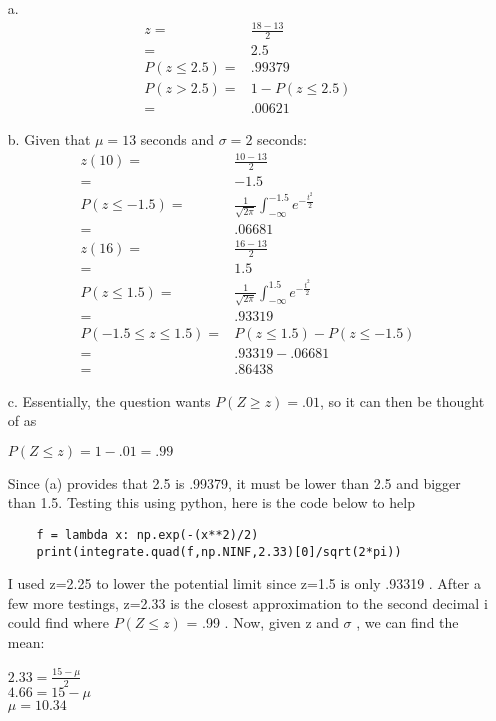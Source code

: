 \documentclass{article}
\begin{document}
\begin{enumerate}
	\item[a.] 
	\begin{align*}
		z =& \frac{18-13}{2} \\
		 =& 2.5 \\
		P(z\leq 2.5) =& .99379\\
		P(z>2.5) =& 1 - P(z\leq 2.5) \\
		 =&  .00621
	\end{align*}
	
	\item[b.] Given that $\mu = 13$ seconds and $\sigma = 2$ seconds:
	\begin{align*}
		z(10) =& \frac{10-13}{2} \\
			=& -1.5 \\
		P(z\leq -1.5) =& \frac{1}{\sqrt{2\pi}}\int_{-\infty}^{-1.5} e^{-\displaystyle \frac{t^2}{2}}\\
			=& .06681 \\
		z(16) =& \frac{16-13}{2} \\
			=& 1.5 \\
		P(z\leq 1.5) =& \frac{1}{\sqrt{2\pi}}\int_{-\infty}^{1.5} e^{-\displaystyle \frac{t^2}{2}}\\
			=& .93319\\
		P(-1.5\leq z\leq 1.5) =& P(z\leq 1.5) - P(z\leq -1.5)\\
			=& .93319 - .06681\\
			=& .86438
	\end{align*}
	
	\item[c.] Essentially, the question wants $P(Z\geq z) = .01$, so it can then be thought of as 
	\begin{center}
		$P(Z\leq z) = 1 - .01 = .99$
	\end{center}
	Since (a) provides that 2.5 is .99379, it must be lower than 2.5 and bigger than 1.5. Testing this using python, here is the code below to help
	\begin{verbatim}
	f = lambda x: np.exp(-(x**2)/2)
	print(integrate.quad(f,np.NINF,2.33)[0]/sqrt(2*pi))
	\end{verbatim}
	I used z=2.25 to lower the potential limit since z=1.5 is only .93319 . After a few more testings, z=2.33 is the closest approximation to the second decimal i could find where $P(Z\leq z)$
	= .99 . Now, given z and $\sigma$ , we can find the mean:
	\begin{center}
		$2.33 = \displaystyle \frac{15-\mu}{2}$ \\
		$4.66 = 15 - \mu$ \\
		$\mu = 10.34$ 
	\end{center}
\end{enumerate}
\end{document}
